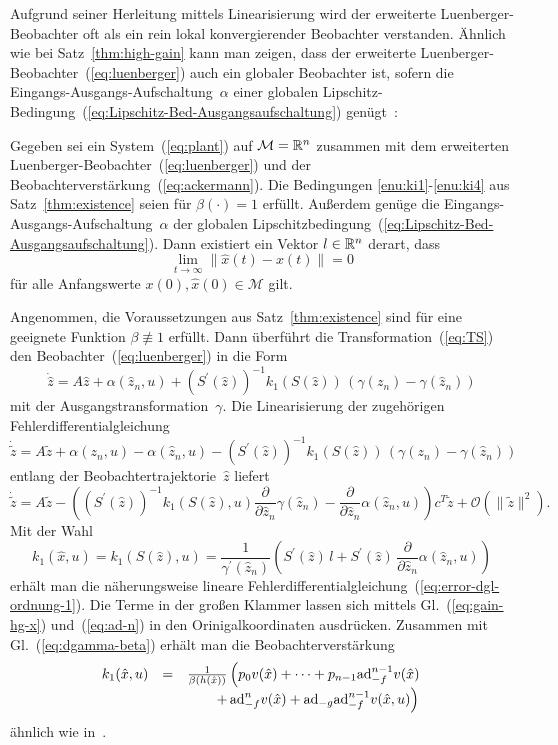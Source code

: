 Aufgrund seiner Herleitung mittels Linearisierung wird der erweiterte
Luenberger-Beobachter oft als ein rein lokal konvergierender Beobachter
verstanden. Ähnlich wie bei Satz~\ref{thm:high-gain} kann man zeigen,
dass der erweiterte Luenberger-Beobachter~(\ref{eq:luenberger})
auch ein globaler Beobachter ist, sofern die Eingangs-Ausgangs-Aufschaltung~$\alpha$
einer globalen Lipschitz-Bedingung~(\ref{eq:Lipschitz-Bed-Ausgangsaufschaltung})
genügt~\cite{roebenack2007iet}:
\begin{theorem}
\label{thm:elo-global} Gegeben sei ein System~(\ref{eq:plant})
auf $\mathcal{M}={\mathbb{R}}^{n}$ zusammen mit dem erweiterten Luenberger-Beobachter~(\ref{eq:luenberger})
und der Beobachterverstärkung~(\ref{eq:ackermann}). Die Bedingungen
\ref{enu:ki1}-\ref{enu:ki4} aus Satz~\ref{thm:existence} seien
für $\beta(\cdot)=1$ erfüllt. Außerdem genüge die Eingangs-Ausgangs-Aufschaltung~$\alpha$
der globalen Lipschitzbedingung~(\ref{eq:Lipschitz-Bed-Ausgangsaufschaltung}).
Dann existiert ein Vektor $l\in{\mathbb{R}}^{n}$ derart, dass 
\[
\lim_{t\to\infty}\|\hat{x}(t)-x(t)\|=0
\]
 für alle Anfangswerte $x(0),\hat{x}(0)\in\mathcal{M}$ gilt. 
\end{theorem}

Angenommen, die Voraussetzungen aus Satz~\ref{thm:existence} sind
für eine geeignete Funktion $\beta\not\equiv1$ erfüllt. Dann überführt
die Transformation~(\ref{eq:TS}) den Beobachter~(\ref{eq:luenberger})
in die Form 
\[
\dot{\hat{z}}=A\hat{z}+\alpha(\hat{z}_{n},u)+\left(S^{\prime}(\hat{z})\right)^{-1}k_{1}(S(\hat{z}))\,(\gamma(z_{n})-\gamma(\hat{z}_{n}))
\]
mit der Ausgangstransformation~$\gamma$. Die Linearisierung der
zugehörigen Fehlerdifferentialgleichung 
\[
\dot{\tilde{z}}=A\tilde{z}+\alpha(z_{n},u)-\alpha(\hat{z}_{n},u)-\left(S^{\prime}(\hat{z})\right)^{-1}k_{1}(S(\hat{z}))\,(\gamma(z_{n})-\gamma(\hat{z}_{n}))
\]
entlang der Beobachtertrajektorie~$\hat{z}$ liefert 
\[
\dot{\tilde{z}}=A\tilde{z}-\left(\left(S^{\prime}(\hat{z})\right)^{-1}k_{1}(S(\hat{z}),u)\frac{\partial}{\partial\hat{z}_{n}}\gamma(\hat{z}_{n})\!-\!\frac{\partial}{\partial\hat{z}_{n}}\alpha(\hat{z}_{n},u)\right)c^{T}\tilde{z}\!+\!\mathcal{O}\left(\|\tilde{z}\|^{2}\right).
\]
Mit der Wahl 
\[
k_{1}(\hat{x},u)=k_{1}(S(\hat{z}),u)=\frac{1}{\gamma^{\prime}(\hat{z}_{n})}\left(S^{\prime}(\hat{z})\,l+S^{\prime}(\hat{z})\,\frac{\partial}{\partial\hat{z}_{n}}\alpha(\hat{z}_{n},u)\right)
\]
erhält man die näherungsweise lineare Fehlerdifferentialgleichung~(\ref{eq:error-dgl-ordnung-1}).
Die Terme in der großen Klammer lassen sich mittels Gl.~(\ref{eq:gain-hg-x})
und~(\ref{eq:ad-n}) in den Orinigalkoordinaten ausdrücken. Zusammen
mit Gl.~(\ref{eq:dgamma-beta}) erhält man die Beobachterverstärkung
\begin{equation}
\begin{array}{lcl}
k_{1}(\hat{x},u) & = & \frac{1}{\beta(h(\hat{x}))}\left(p_{0}v(\hat{x})+\cdots+p_{n-1}{\operatorname{ad}}_{-f}^{n-1}v(\hat{x})\right.\\
 &  & \left.\quad\quad+\,{\operatorname{ad}}_{-f}^{n}v(\hat{x})+{\operatorname{ad}}_{-g}{\operatorname{ad}}_{-f}^{n-1}v(\hat{x},u)\right)
\end{array}\label{eq:ackermann-mit-ausgangstransformation}
\end{equation}
ähnlich wie in~\cite{schaffner99}.


